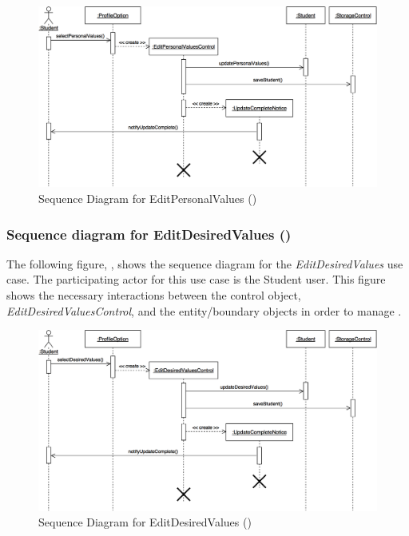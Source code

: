 \documentclass[12pt,letterpaper]{article}
\begin{document}
\begin{figure}[H]
	\centering{}
	\includegraphics[scale=0.25]{imgs/seq/edit-personal-values.png}
	\caption[ - Sequence Diagram for EditPersonalValues]{Sequence Diagram for EditPersonalValues ()}
\end{figure}

\subsubsection*{Sequence diagram for EditDesiredValues ()}

The following figure, , shows the sequence diagram for the {\it EditDesiredValues} use case. The participating actor for this use case is
the Student user. This figure shows the necessary interactions between the control object, {\it EditDesiredValuesControl}, and the
entity/boundary objects in order to manage .

\begin{figure}[H]
	\centering{}
	\includegraphics[scale=0.25]{imgs/seq/edit-desired-values.png}
	\caption[ - Sequence Diagram for EditDesiredValues]{Sequence Diagram for EditDesiredValues ()}
\end{figure}
\end{document}
